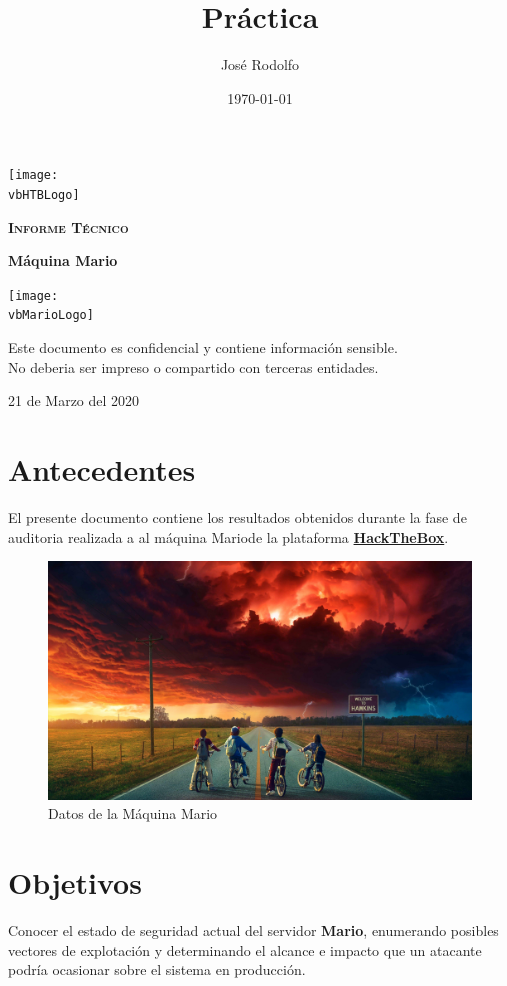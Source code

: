 \documentclass[a4paper]{article}
\title{Práctica}
\author{José Rodolfo}
\date{\today}
\newcommand{\vbMachineName}{Mario}
\newcommand{\vbHTBLogo}{img/htb-logo-2.png}
\newcommand{\vbMarioLogo}{img/mario.png}
\newcommand{\startDate}{21 de Marzo del 2020}
\begin{document}
  \begin{titlepage}
    \centering
    \texttt{[image: \\vbHTBLogo]}\par
    {\scshape\LARGE\textbf{Informe Técnico}}\par
    \vspace{5mm}
    {\Huge\bfseries\textcolor{greenPortada}{Máquina \vbMachineName}}\par
    \vfill
    \texttt{[image: \\vbMarioLogo]}\par
    \vfill
    \begin{tcolorbox}[colback=red!5!white,colframe=red!75!black]
      \centering
      Este documento es confidencial y contiene información sensible.\\
      No deberia ser impreso o compartido con terceras entidades.
    \end{tcolorbox}
    {\large\startDate}
  \end{titlepage}
  \newpage
  \renewcommand{\contentsname}{Tabla de contenido}
  \tableofcontents
  \newpage
  \section{Antecedentes}
  El presente documento contiene los resultados obtenidos durante la fase de auditoria realizada a al máquina \vbMachineName de la plataforma \href{https://hackthebox.eu/}{\textbf{\color{greenPortada}HackTheBox}}.
  \begin{figure}[h]
    \includegraphics[width=\textwidth]{img/stranger-things.jpg}
    \caption{Datos de la Máquina \vbMachineName}
  \end{figure}
  \section{Objetivos}
  Conocer el estado de seguridad actual del servidor \textbf{\vbMachineName}, enumerando posibles vectores de explotación y determinando el alcance e impacto que un atacante podría ocasionar sobre el sistema en producción.
\end{document}
